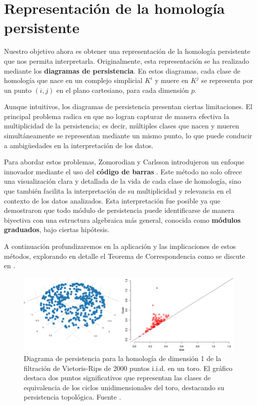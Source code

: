 \section{Representación de la homología persistente}

Nuestro objetivo ahora es obtener una representación de la homología persistente que nos permita interpretarla. Originalmente, esta representación se ha realizado mediante los \textbf{diagramas de persistencia}. En estos diagramas, cada clase de homología que nace en un complejo simplicial \(K^{i}\) y muere en \(K^{j}\) se representa por un punto \((i, j)\) en el plano cartesiano, para cada dimensión \(p\).

Aunque intuitivos, los diagramas de persistencia presentan ciertas limitaciones. El principal problema radica en que no logran capturar de manera efectiva la multiplicidad de la persistencia; es decir, múltiples clases que nacen y mueren simultáneamente se representan mediante un mismo punto, lo que puede conducir a ambigüedades en la interpretación de los datos.

Para abordar estos problemas, Zomorodian y Carlsson introdujeron un enfoque innovador mediante el uso del \textbf{código de barras} \cite{zomorodian2004computing}. Este método no solo ofrece una visualización clara y detallada de la vida de cada clase de homología, sino que también facilita la interpretación de su multiplicidad y relevancia en el contexto de los datos analizados. Esta interpretación fue posible ya que demostraron que todo módulo de persistencia puede identificarse de manera biyectiva con una estructura algebraica más general, conocida como \textbf{módulos graduados}, bajo ciertas hipótesis.

A continuación profundizaremos en la aplicación y las implicaciones de estos métodos, explorando en detalle el Teorema de Correspondencia como se discute en \cite{Corbet_2018}.

\begin{figure}
	\centering
	\includegraphics[width=\textwidth]{img/persistence-diagram.png}
	\caption{Diagrama de persistencia para la homología de dimensión 1 de la filtración de Vietoris-Rips de 2000 puntos i.i.d. en un toro. El gráfico destaca dos puntos significativos que representan las clases de equivalencia de los ciclos unidimensionales del toro, destacando su persistencia topológica. Fuente \cite{divol2019}.}
\end{figure}

